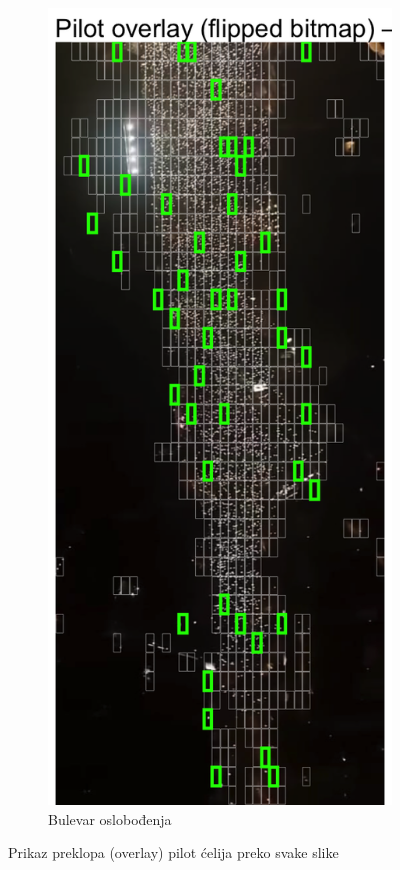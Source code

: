 \documentclass[a4paper,12pt]{article}
\begin{document}
\begin{figure}[H]
\begin{subfigure}[b]{0.3\textwidth}
	  \label{fig:kralja-milana}
	\end{subfigure}
	\hfill
	\begin{subfigure}[b]{0.3\textwidth}
	  \centering
	  \includegraphics[width=\textwidth]{../outputs/sampling_outputs/plot_overlays_image/pilot_overlay_bulevar-oslobodjenja.png}
	  \caption{Bulevar oslobođenja}
	  \label{fig:bulevar-oslobodjenja}
	\end{subfigure}
  
	\caption{Prikaz preklopa (overlay) pilot ćelija preko svake slike}
\end{figure}
\end{document}
